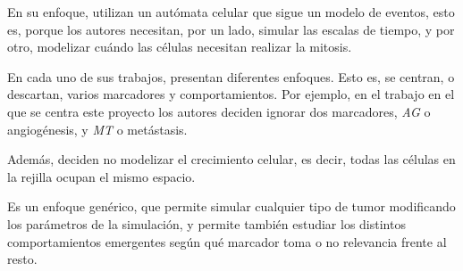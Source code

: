 En su enfoque, utilizan un autómata celular que sigue un modelo de eventos, esto es, porque los autores
necesitan, por un lado, simular las escalas de tiempo, y por otro, modelizar cuándo las células necesitan
realizar la mitosis.

En cada uno de sus trabajos, presentan diferentes enfoques. Esto es, se centran, o descartan, varios marcadores y
comportamientos. Por ejemplo, en el trabajo en el que se centra este proyecto \cite{jsantos-amonteagudo-1-2014}
los autores deciden ignorar dos marcadores, \textit{AG} o angiogénesis, y \textit{MT} o metástasis.

Además, deciden no modelizar el crecimiento celular, es decir, todas las células en la rejilla ocupan
el mismo espacio.

Es un enfoque genérico, que permite simular cualquier tipo de tumor modificando los parámetros de la
simulación, y permite también estudiar los distintos comportamientos emergentes según
qué marcador toma o no relevancia frente al resto.
